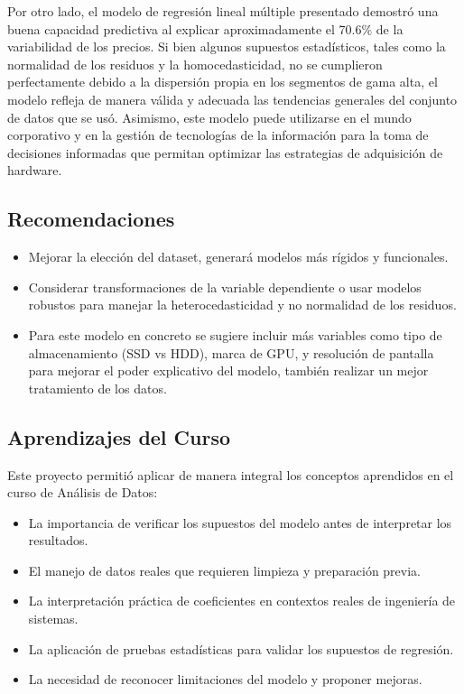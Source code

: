 \documentclass[12pt,a4paper]{article}
\begin{document}
Por otro lado, el modelo de regresión lineal múltiple presentado demostró una buena capacidad predictiva al explicar aproximadamente el 70.6\% de la variabilidad de los precios. Si bien algunos supuestos estadísticos, tales como la normalidad de los residuos y la homocedasticidad, no se cumplieron perfectamente debido a la dispersión propia en los segmentos de gama alta, el modelo refleja de manera válida y adecuada las tendencias generales del conjunto de datos que se usó. Asimismo, este modelo puede utilizarse en el mundo corporativo y en la gestión de tecnologías de la información para la toma de decisiones informadas que permitan optimizar las estrategias de adquisición de hardware.


\subsection{Recomendaciones}

\begin{itemize}[leftmargin=1.5cm]
    \item Mejorar la elección del dataset, generará modelos más rígidos y funcionales.
    
    \item Considerar transformaciones de la variable dependiente o usar modelos robustos para manejar la heterocedasticidad y no normalidad de los residuos.
    
    \item Para este modelo en concreto se sugiere incluir más variables como tipo de almacenamiento (SSD vs HDD), marca de GPU, y resolución de pantalla para mejorar el poder explicativo del modelo, también realizar un mejor tratamiento de los datos.
\end{itemize}

\subsection{Aprendizajes del Curso}

Este proyecto permitió aplicar de manera integral los conceptos aprendidos en el curso de Análisis de Datos:

\begin{itemize}[leftmargin=1.5cm]
    \item La importancia de verificar los supuestos del modelo antes de interpretar los resultados.
    \item El manejo de datos reales que requieren limpieza y preparación previa.
    \item La interpretación práctica de coeficientes en contextos reales de ingeniería de sistemas.
    \item La aplicación de pruebas estadísticas para validar los supuestos de regresión.
    \item La necesidad de reconocer limitaciones del modelo y proponer mejoras.
\end{itemize}
\end{document}
